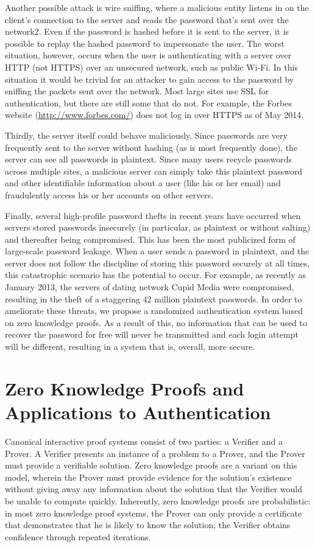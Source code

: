 \documentclass[11pt]{article}
\begin{document}
Another possible attack is wire sniffing, where a malicious entity listens in on the client’s connection to the server and reads the password that’s sent over the network2.  Even if the password is hashed before it is sent to the server, it is possible to replay the hashed password to impersonate the user.  The worst situation, however, occurs when the user is authenticating with a server over HTTP (not HTTPS) over an unsecured network, such as public Wi-Fi.  In this situation it would be trivial for an attacker to gain access to the password by sniffing the packets sent over the network. Most large sites use SSL for authentication, but there are still some that do not.  For example, the Forbes website (\url{http://www.forbes.com/}) does not log in over HTTPS as of May 2014.

Thirdly, the server itself could behave maliciously. Since passwords are very frequently sent to the server without hashing (as is most frequently done), the server can see all passwords in plaintext. Since many users recycle passwords across multiple sites, a malicious server can simply take this plaintext password and other identifiable information about a user (like his or her email) and fraudulently access his or her accounts on other servers.

Finally, several high-profile password thefts in recent years have occurred when servers stored passwords insecurely (in particular, as plaintext or without salting) and thereafter being compromised.  This has been the most publicized form of large-scale password leakage.  When a user sends a password in plaintext, and the server does not follow the discipline of storing this password securely at all times, this catastrophic scenario has the potential to occur.  For example, as recently as January 2013, the servers of dating network Cupid Media were compromised, resulting in the theft of a staggering 42 million plaintext passwords. 
In order to ameliorate these threats, we propose a randomized authentication system based on zero knowledge proofs. As a result of this, no information that can be used to recover the password for free will never be transmitted and each login attempt will be different, resulting in a system that is, overall, more secure.

\section{Zero Knowledge Proofs and Applications to Authentication}

Canonical interactive proof systems consist of two parties: a Verifier and a Prover.  A Verifier presents an instance of a problem to a Prover, and the Prover must provide a verifiable solution.  Zero knowledge proofs are a variant on this model, wherein the Prover must provide evidence for the solution’s existence without giving away any information about the solution that the Verifier would be unable to compute quickly.  Inherently, zero knowledge proofs are probabilistic: in most zero knowledge proof systems, the Prover can only provide a certificate that demonstrates that he is likely to know the solution; the Verifier obtains confidence through repeated iterations.
\end{document}
